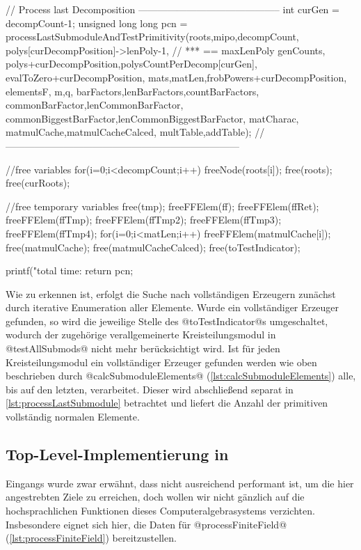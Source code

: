 \begin{ccode}[caption={Aus \url{../Sage/enumeratePCNs.c}},
  firstnumber=1173, label=lst:processFiniteField]
{    // Process last Decomposition --------------------------------------------
    int curGen = decompCount-1;
    unsigned long long pcn = 
        processLastSubmoduleAndTestPrimitivity(roots,mipo,decompCount,
            polys[curDecompPosition]->lenPoly-1, // *** == maxLenPoly
            genCounts,
            polys+curDecompPosition,polysCountPerDecomp[curGen],
            evalToZero+curDecompPosition,
            mats,matLen,frobPowers+curDecompPosition,
            elementsF,
            m,q,
            barFactors,lenBarFactors,countBarFactors,
            commonBarFactor,lenCommonBarFactor,
            commonBiggestBarFactor,lenCommonBiggestBarFactor,
            matCharac,
            matmulCache,matmulCacheCalced,
            multTable,addTable);
    //------------------------------------------------------------------------

    //free variables
    for(i=0;i<decompCount;i++)
        freeNode(roots[i]);
    free(roots); free(curRoots);

    //free temporary variables
    free(tmp);
    freeFFElem(ff);
    freeFFElem(ffRet);
    freeFFElem(ffTmp);
    freeFFElem(ffTmp2);
    freeFFElem(ffTmp3);
    freeFFElem(ffTmp4);
    for(i=0;i<matLen;i++) freeFFElem(matmulCache[i]);
    free(matmulCache);
    free(matmulCacheCalced);
    free(toTestIndicator);

    
    printf("total time: %
    return pcn;
}
\end{ccode}

Wie zu erkennen ist, erfolgt die Suche nach vollständigen Erzeugern zunächst
durch iterative Enumeration aller Elemente. Wurde ein vollständiger Erzeuger
gefunden, so wird die jeweilige Stelle des @toTestIndicator@s umgeschaltet,
wodurch der zugehörige verallgemeinerte Kreisteilungsmodul in 
@testAllSubmods@ nicht mehr berücksichtigt wird. Ist für jeden
Kreisteilungsmodul ein vollständiger Erzeuger gefunden werden wie oben
beschrieben durch @calcSubmoduleElements@ (\autoref{lst:calcSubmoduleElements})
alle, bis auf den letzten, verarbeitet. Dieser wird abschließend separat in
\autoref{lst:processLastSubmodule}
betrachtet und liefert die Anzahl der primitiven vollständig normalen Elemente.


\subsection{Top-Level-Implementierung in \sage}

Eingangs wurde zwar erwähnt, dass \sage nicht ausreichend performant ist, um
die hier angestrebten Ziele zu erreichen, doch wollen wir nicht gänzlich auf
die hochsprachlichen Funktionen dieses Computeralgebrasystems verzichten.
Insbesondere eignet sich \sage hier, die Daten für
@processFiniteField@ (\autoref{lst:processFiniteField}) bereitzustellen.

